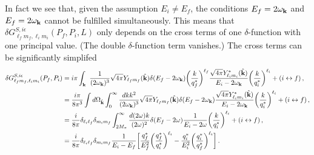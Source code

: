 In fact we see that, given the assumption $E_i \neq E_f$, the conditions $E_f  = 2 \omega_{\textbf k}$ and $E_f  = 2 \omega_{\textbf k}$ cannot be fulfilled simultaneously. This means that $ \delta G^{S, i \epsilon}_{  \ell_f m_{f},  \ell_i m_{i}}(P_f,P_i,L) $ only depends on the cross terms of one $\delta$-function with one principal value. (The double $\delta$-function term vanishes.) The cross terms can be significantly simplifed
\begin{align}
  \delta G^{S, i \epsilon}_{  \ell_f m_{f},  \ell_i m_{i}}(P_f,P_i)  & = i \pi  \int_{\textbf k} 
~\frac{1}{(2\omega_{\textbf k})^3}  
 \sqrt{4 \pi}  Y_{\ell_fm_{ f}}(\hat {\textbf k} )
    \delta(E_f - 2 \omega_{\textbf k})
  \bigg (\frac{k }{q^*_{f}} \bigg)^{\ell_f }
  \frac{ \sqrt{4 \pi}  
Y^*_{\ell_i m_{i}}(\hat {\textbf k} )
 }{ E_i - 2 \omega_{\textbf k}   } 
 \bigg (\frac{k }{q^*_{i}} \bigg)^{\ell_i }  + (i \leftrightarrow f) \,, \\
 & = \frac{i \pi}{8 \pi^3} \int d \Omega_{\hat {\textbf k}}  \int_0^\infty \frac{dk k^2 }{(2\omega_{\textbf k})^3}  
 \sqrt{4 \pi}  Y_{\ell_fm_{ f}}(\hat {\textbf k} )
    \delta(E_f - 2 \omega_{\textbf k})
  \frac{ \sqrt{4 \pi}  
Y^*_{\ell_i m_{i}}(\hat {\textbf k} )
 }{ E_i - 2 \omega_{\textbf k}   } 
 \bigg (\frac{k }{q^*_{i}} \bigg)^{\ell_i }  + (i \leftrightarrow f) \,, \\
& =  \frac{i }{8 \pi } \delta_{\ell_i \ell_f} \delta_{m_i m_f}     \int_{2M_\pi}^\infty \frac{d(2\omega)   k }{(2\omega)^2}  
    \delta(E_f - 2 \omega )
  \frac{ 1
 }{ E_i - 2 \omega   } 
 \bigg (\frac{k }{q^*_{i}} \bigg)^{\ell_i }  + (i \leftrightarrow f) \,, \\
 & =  \frac{i}{8 \pi}  \delta_{\ell_i \ell_f} \delta_{m_i m_f} \frac{1}{E_i - E_f} \bigg [ \frac{q_f^*}{ E_f^2}  \bigg (\frac{q^*_f }{q^*_{i}} \bigg)^{\ell_i } - \frac{q_i^*}{ E_i^2}  \bigg (\frac{q^*_i }{q^*_{f}} \bigg)^{\ell_i } \bigg ]    \,.
\end{align}
{}


